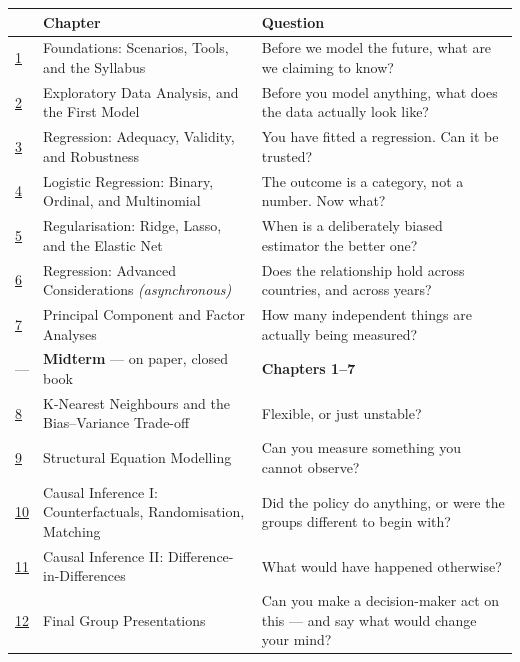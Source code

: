 \documentclass[
  letterpaper,
  10pt,
  twoside,
  openright,
  numbers=noenddot,
  chapterprefix=true]{scrbook}
\begin{document}
\begin{longtable}[]{@{}
  >{\raggedright\arraybackslash}p{}
  >{\raggedright\arraybackslash}p{}
  >{\raggedright\arraybackslash}p{}@{}}
\toprule\noalign{}
\begin{minipage}[b]{\linewidth}\raggedright
\end{minipage} & \begin{minipage}[b]{\linewidth}\raggedright
Chapter
\end{minipage} & \begin{minipage}[b]{\linewidth}\raggedright
Question
\end{minipage} \\
\midrule\noalign{}
\endhead
\bottomrule\noalign{}
\endlastfoot
\href{session-01.qmd}{1} & Foundations: Scenarios, Tools, and the
Syllabus & Before we model the future, what are we claiming to know? \\
\href{session-02.qmd}{2} & Exploratory Data Analysis, and the First
Model & Before you model anything, what does the data actually look
like? \\
\href{session-03.qmd}{3} & Regression: Adequacy, Validity, and
Robustness & You have fitted a regression. Can it be trusted? \\
\href{session-04.qmd}{4} & Logistic Regression: Binary, Ordinal, and
Multinomial & The outcome is a category, not a number. Now what? \\
\href{session-05.qmd}{5} & Regularisation: Ridge, Lasso, and the Elastic
Net & When is a deliberately biased estimator the better one? \\
\href{session-06.qmd}{6} & Regression: Advanced Considerations
\emph{(asynchronous)} & Does the relationship hold across countries, and
across years? \\
\href{session-07.qmd}{7} & Principal Component and Factor Analyses & How
many independent things are actually being measured? \\
--- & \textbf{Midterm} --- on paper, closed book & \textbf{Chapters
1--7} \\
\href{session-08.qmd}{8} & K-Nearest Neighbours and the Bias--Variance
Trade-off & Flexible, or just unstable? \\
\href{session-09.qmd}{9} & Structural Equation Modelling & Can you
measure something you cannot observe? \\
\href{session-10.qmd}{10} & Causal Inference I: Counterfactuals,
Randomisation, Matching & Did the policy do anything, or were the groups
different to begin with? \\
\href{session-11.qmd}{11} & Causal Inference II:
Difference-in-Differences & What would have happened otherwise? \\
\href{session-12.qmd}{12} & Final Group Presentations & Can you make a
decision-maker act on this --- and say what would change your mind? \\
\end{longtable}
\end{document}
